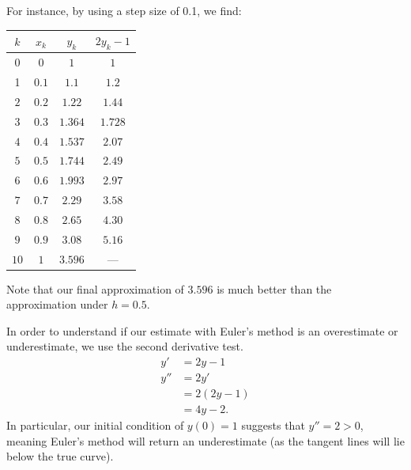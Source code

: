 \documentclass[10pt]{mypackage}
\begin{document}
\begin{example}
  For instance, by using a step size of 0.1, we find:
  \begin{center}
    \begin{tabular}{c|c|c|c}
      $k$ & $x_k$ & $y_k$ & $2y_k - 1$\\
      \hline
      $0$ & $0$ & $1$ & $1$\\
      1 & $0.1$ & $1.1$ & $1.2$ \\
      $2$ & $0.2$ & $1.22$& $1.44$ \\
      $3$ & $0.3$ & $1.364$& $1.728$\\
      $4$ & $0.4$ &$1.537$ & $2.07$\\
      $5$ & $0.5$ & $1.744$& $2.49$\\
      $6$ & $0.6$ & $1.993$ & $2.97$\\
      $7$ & $0.7$ & $2.29$ & $3.58$\\
      $8$ & $0.8$ & $2.65$ & $4.30$\\
      $9$ & $0.9$ & $3.08$& $5.16$\\
      $10$ & $1$ & $3.596$ & ---
    \end{tabular}
  \end{center}
  Note that our final approximation of $3.596$ is much better than the approximation under $h = 0.5$.\newline

  In order to understand if our estimate with Euler's method is an overestimate or underestimate, we use the second derivative test.
  \begin{align*}
    y' &= 2y - 1\\
    y'' &= 2y'\\
       &= 2\left(2y-1\right)\\
       &= 4y-2.
  \end{align*}
  In particular, our initial condition of $y(0) = 1$ suggests that $y'' = 2 > 0$, meaning Euler's method will return an underestimate (as the tangent lines will lie below the true curve).
\end{example}
\end{document}
